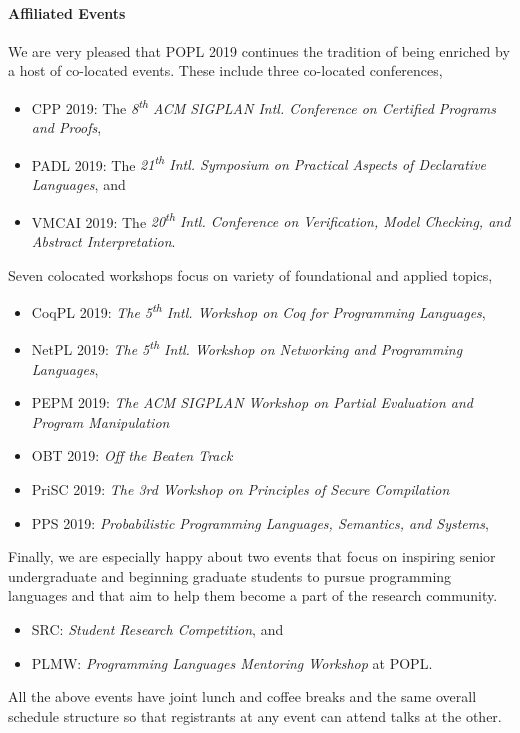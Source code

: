 \paragraph{Affiliated Events}
%
We are very pleased that POPL 2019 continues the tradition of being enriched
by a host of co-located events.
%
These include three co-located conferences,
%
\begin{itemize}
  \item CPP 2019:   The \emph{8\textsuperscript{th} ACM SIGPLAN Intl. Conference on Certified Programs and Proofs},
  \item PADL 2019:  The \emph{21\textsuperscript{th} Intl. Symposium on Practical Aspects of Declarative Languages}, and
  \item VMCAI 2019: The \emph{20\textsuperscript{th} Intl. Conference on Verification, Model Checking, and Abstract Interpretation}.
\end{itemize}
%
Seven colocated workshops focus on variety of foundational and applied topics,
%
\begin{itemize}
  \item CoqPL 2019: \emph{The 5\textsuperscript{th} Intl. Workshop on Coq for Programming Languages},
  \item NetPL 2019: \emph{The 5\textsuperscript{th} Intl. Workshop on Networking and Programming Languages},
  \item PEPM 2019:  \emph{The ACM SIGPLAN Workshop on Partial Evaluation and Program Manipulation}
  \item OBT 2019:   \emph{Off the Beaten Track}
  \item PriSC 2019: \emph{The 3rd Workshop on Principles of Secure Compilation}
  \item PPS 2019:   \emph{Probabilistic Programming Languages, Semantics, and Systems},
\end{itemize}
%
Finally, we are especially happy about two events that
focus on inspiring senior undergraduate and beginning
graduate students to pursue programming languages and
that aim to help them become a part of the research
community.
%
\begin{itemize}
\item SRC: \emph{Student Research Competition}, and
\item PLMW: \emph{Programming Languages Mentoring Workshop} at POPL.
\end{itemize}
%
All the above events have joint lunch and coffee breaks
and the same overall schedule structure so that registrants
at any event can attend talks at the other.

